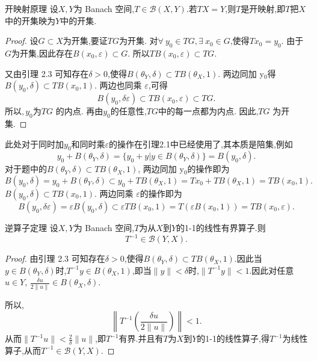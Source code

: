 \documentclass[lang=cn,18pt]{elegantbook}
\begin{document}
\begin{theorem}{开映射原理}
    设$X,Y$为 Banach 空间,$T\in\mathscr{B}(X,Y).$若$TX=Y$,则$T$是开映射,即$T$把$X$中的开集映为$Y$中的开集.
\end{theorem}
\begin{proof}
    设$G\subset X$为开集,要证$TG$为开集. 对$\forall\: y_0\in TG,\exists \:x_0\in G$,使得$Tx_0=y_0.$ 由于$G$为开集,因此存在$B(x_0,\varepsilon)\subset G.$
所以$TB(x_0,\varepsilon)\subset TG.$

又由引理 2.3 可知存在$\delta>0$,使得$B(\theta_Y,\delta)\subset TB(\theta_X,1).$
两边同加 y$_0$得$B(y_0,\delta)\subset TB(x_0,1).$
两边也同乘 $\varepsilon$,可得 $$B( y_0, \delta \varepsilon ) \subset TB( x_0, \varepsilon ) \subset TG.$$
所以$,y_0$为$TG$ 的内点.
再由$y_0$的任意性,$TG$中的每一点都为内点.
因此,$TG$ 为开集.
\end{proof}
\begin{note}
    此处对于同时加$y_0$和同时乘$\varepsilon$的操作在引理2.1中已经使用了,其本质是陪集,例如
    $$y_0 +B(\theta_Y,\delta)=\{y_0 + y|y\in B(\theta_Y,\delta)\}=B(y_0,\delta).$$
    对于题中的$B(\theta_Y,\delta)\subset TB(\theta_X,1)$,
两边同加 y$_0$的操作即为
$$B(y_0,\delta)=y_0 + B(\theta_Y,\delta{}) \subset y_0 + TB(\theta_X,1) = Tx_0 + TB(\theta_X,1) =TB(x_0,1).$$
$B(y_0,\delta)\subset TB(x_0,1).$
两边同乘 $\varepsilon$的操作即为
$$B(y_0,\delta \varepsilon)=\varepsilon B(y_0,\delta) \subset \varepsilon TB(x_0,1)=T(\varepsilon B(x_0,1))=TB(x_0,\varepsilon).$$
\end{note}

\begin{theorem}{逆算子定理}
     设$X,Y$为 Banach 空间,$T$为从$X$到$Y$的1-1的线性有界算子.则
$$T^{-1}\in\mathscr{B}(Y,X).$$
\end{theorem}
\begin{proof}
    由引理 2.3 可知存在$\delta>0$,使得$B(\theta_Y,\delta)\subset TB(\theta_X,1).$因此当$y\in B(\theta_Y,\delta)$时,$T^{-1}y\in B(\theta_X,1)$,即当$\|y\|<\delta$时,$\|T^{-1}y\|<1.$因此对任意$u\in Y$, $\frac {\delta u}{2\| u\| }\in B( \theta_X , \delta ) .$

所以,
$$\left\|T^{-1}\left(\frac{\delta u}{2\|u\|}\right)\right\|<1.$$
从而$\|T^{-1}u\|<\frac2\delta\|u\|$,即$T^{-1}$有界.并且有$T$为$X$到$Y$的1-1的线性算子,得$T^{-1}$为线性算子,从而$T^{-1}\in\mathscr{B}(Y,X).$
\end{proof}
\end{document}

